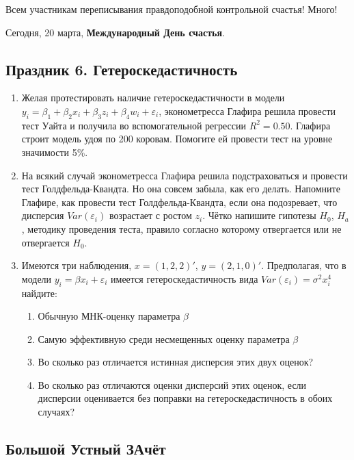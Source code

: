 \documentclass[12pt, a4paper]{article}\usepackage[]{graphicx}\usepackage[]{color}
\begin{document}
\vspace{20pt}

Всем участникам переписывания правдоподобной контрольной счастья! Много!

\vspace{20pt}

Сегодня, 20 марта, \textbf{Международный День счастья}.


\subsection{Праздник 6. Гетероскедастичность}

\begin{enumerate}
\item Желая протестировать наличие гетероскедастичности в модели $y_i=\beta_1+\beta_2 x_i +\beta_3 z_i +\beta_4 w_i +\varepsilon_i$, эконометресса Глафира решила провести тест Уайта и получила  во вспомогательной регрессии $R^2=0.50$. Глафира строит модель удоя по 200 коровам. Помогите ей провести тест на уровне значимости 5\%.
\item На всякий случай эконометресса Глафира решила подстраховаться и провести тест Голдфельда-Квандта. Но она совсем забыла, как его делать. Напомните Глафире, как провести тест Голдфельда-Квандта, если она подозревает, что дисперсия $Var(\varepsilon_i)$ возрастает с ростом $z_i$. Чётко напишите гипотезы $H_0$, $H_a$, методику проведения теста, правило согласно которому отвергается или не отвергается $H_0$.
\item Имеются три наблюдения, $x=(1,2,2)'$, $y=(2,1,0)'$. Предполагая, что в модели $y_i=\beta x_i + \varepsilon_i$ имеется гетероскедастичность вида $Var(\varepsilon_i)=\sigma^2 x_i^4$ найдите:
\begin{enumerate}
\item Обычную МНК-оценку параметра $\beta$
\item Самую эффективную среди несмещенных оценку параметра $\beta$
\item Во сколько раз отличается истинная дисперсия этих двух оценок?
\item Во сколько раз отличаются оценки дисперсий этих оценок, если дисперсии оценивается без поправки на гетероскедастичность в обоих случаях?
\end{enumerate}
\end{enumerate}

\subsection{Большой Устный ЗАчёт}
\end{document}
